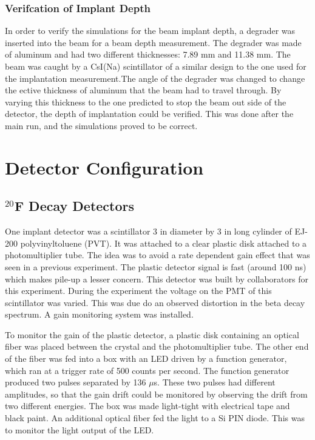 \documentclass[main.tex]{subfiles}
\begin{document}
\subsubsection{Verifcation of Implant Depth}

In order to verify the simulations for the beam implant depth, a degrader was inserted into the beam for a beam depth measurement.
The degrader was made of aluminum and had two different thicknesses: 7.89 mm and 11.38 mm. 
The beam was caught by a CsI(Na) scintillator of a similar design to the one used for the implantation measurement.The angle of the degrader was changed to change the ective thickness of aluminum that the beam
had to travel through. By varying this thickness to the one predicted to stop the beam out side of the detector, the depth of implantation could be verified. 
This was done after the main run, and the simulations proved to be correct.

\section{Detector Configuration}

\subsection{$^{20}$F Decay Detectors}
One implant detector was a scintillator 3 in diameter by 3 in long cylinder of EJ-200 polyvinyltoluene (PVT).
It was attached to a clear plastic disk attached to a photomultiplier tube.
The idea was to avoid a rate dependent gain effect that was seen in a previous experiment.
The plastic detector signal is fast (around 100 ns) which makes pile-up a lesser concern.
This detector was built by collaborators for this experiment.
During the experiment the voltage on the PMT of this scintillator was varied.
This was due do an observed distortion in the beta decay spectrum.
A gain monitoring system was installed.

To monitor the gain of the plastic detector, a plastic disk containing an optical fiber was placed between the crystal and the photomultiplier tube. 
The other end of the fiber was fed into a box with an LED driven by a function generator, which ran at a trigger rate of 500 counts per second. 
The function generator produced two pulses separated by 136 $\mu$s.
These two pulses had different amplitudes, so that the gain drift could be monitored by observing the drift from two different energies.
The box was made light-tight with electrical tape and black paint.
An additional optical fiber fed the light to a Si PIN diode.
This was to monitor the light output of the LED.
\end{document}
